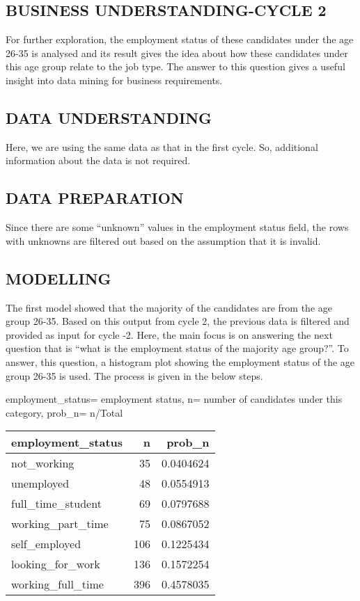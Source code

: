 \documentclass[
]{article}
\begin{document}
\hypertarget{business-understanding-cycle-2}{%
\subsection{BUSINESS UNDERSTANDING-CYCLE
2}\label{business-understanding-cycle-2}}

For further exploration, the employment status of these candidates under
the age 26-35 is analysed and its result gives the idea about how these
candidates under this age group relate to the job type. The answer to
this question gives a useful insight into data mining for business
requirements.

\hypertarget{data-understanding-2}{%
\subsection{DATA UNDERSTANDING}\label{data-understanding-2}}

Here, we are using the same data as that in the first cycle. So,
additional information about the data is not required.

\hypertarget{data-preparation-2}{%
\subsection{DATA PREPARATION}\label{data-preparation-2}}

Since there are some ``unknown'' values in the employment status field,
the rows with unknowns are filtered out based on the assumption that it
is invalid.

\hypertarget{modelling-1}{%
\subsection{MODELLING}\label{modelling-1}}

The first model showed that the majority of the candidates are from the
age group 26-35. Based on this output from cycle 2, the previous data is
filtered and provided as input for cycle -2. Here, the main focus is on
answering the next question that is ``what is the employment status of
the majority age group?''. To answer, this question, a histogram plot
showing the employment status of the age group 26-35 is used. The
process is given in the below steps.

employment\_status= employment status, n= number of candidates under
this category, prob\_n= n/Total

\begin{longtable}[]{@{}lrr@{}}
\toprule
employment\_status & n & prob\_n \\
\midrule
\endhead
not\_working & 35 & 0.0404624 \\
unemployed & 48 & 0.0554913 \\
full\_time\_student & 69 & 0.0797688 \\
working\_part\_time & 75 & 0.0867052 \\
self\_employed & 106 & 0.1225434 \\
looking\_for\_work & 136 & 0.1572254 \\
working\_full\_time & 396 & 0.4578035 \\
\bottomrule
\end{longtable}
\end{document}
